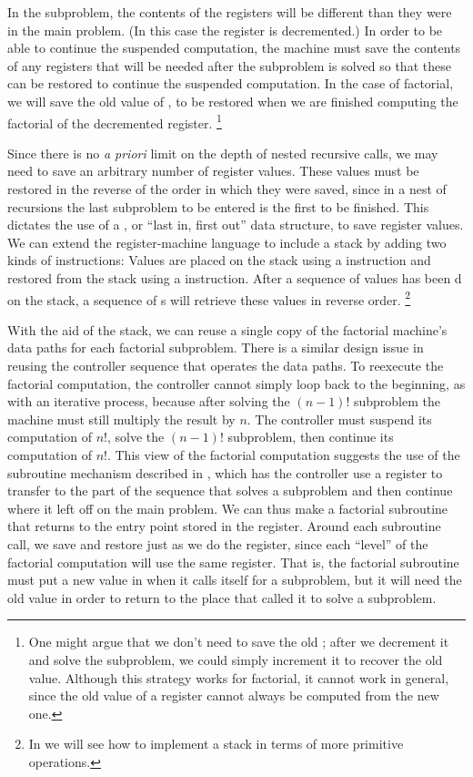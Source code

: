 In the subproblem, the contents of the registers will be different than they were in the main problem.
(In this case the  register is decremented.)
In order to be able to continue the suspended computation, the machine must save the contents of any registers that will be needed after the subproblem is solved so that these can be restored to continue the suspended computation.
In the case of factorial, we will save the old value of , to be restored when we are finished computing the factorial of the decremented  register.%
\footnote{
	One might argue that we don’t need to save the old ;
	after we decrement it and solve the subproblem, we could simply increment it to recover the old value.
	Although this strategy works for factorial, it cannot work in general, since the old value of a register cannot always be computed from the new one.
}

Since there is no \emph{a priori} limit on the depth of nested recursive calls, we may need to save an arbitrary number of register values.
These values must be restored in the reverse of the order in which they were saved, since in a nest of recursions the last subproblem to be entered is the first to be finished.
This dictates the use of a , or “last in, first out” data structure, to save register values.
We can extend the register-machine language to include a stack by adding two kinds of instructions:
Values are placed on the stack using a  instruction and restored from the stack using a  instruction.
After a sequence of values has been d on the stack, a sequence of s will retrieve these values in reverse order.%
\footnote{
	In  we will see how to implement a stack in terms of more primitive operations.
}

With the aid of the stack, we can reuse a single copy of the factorial machine’s data paths for each factorial subproblem.
There is a similar design issue in reusing the controller sequence that operates the data paths.
To reexecute the factorial computation, the controller cannot simply loop back to the beginning, as with an iterative process, because after solving the \( (n - 1)! \) subproblem the machine must still multiply the result by \( n \).
The controller must suspend its computation of \( n! \), solve the \( (n - 1)! \) subproblem, then continue its computation of \( n! \).
This view of the factorial computation suggests the use of the subroutine mechanism described in , which has the controller use a  register to transfer to the part of the sequence that solves a subproblem and then continue where it left off on the main problem.
We can thus make a factorial subroutine that returns to the entry point stored in the  register.
Around each subroutine call, we save and restore  just as we do the  register, since each “level” of the factorial computation will use the same  register.
That is, the factorial subroutine must put a new value in  when it calls itself for a subproblem, but it will need the old value in order to return to the place that called it to solve a subproblem.

